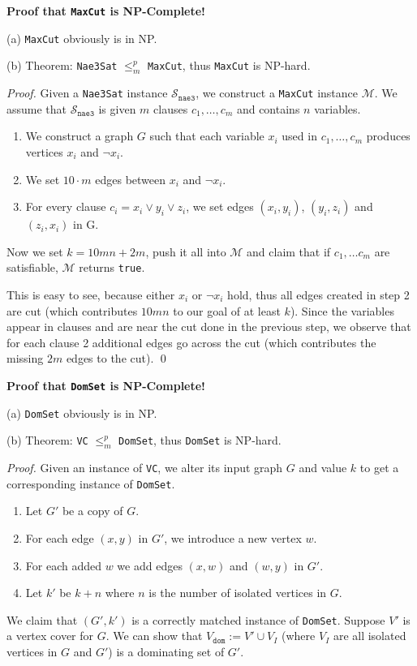 \documentclass[12pt]{article}
\newcommand{\polyreduce}{$\leq_{m}^{p}$}
\begin{document}
  \textbf{Proof that \texttt{MaxCut} is NP-Complete!}

(a) \texttt{MaxCut} obviously is in NP.

(b) Theorem: \texttt{Nae3Sat} \polyreduce{} \texttt{MaxCut}, thus \texttt{MaxCut} is NP-hard.

\vspace{.3cm}
\noindent \textit{Proof.} Given a \texttt{Nae3Sat} instance $\mathcal{S}_{\texttt{nae3}}$, we construct a \texttt{MaxCut} instance $\mathcal{M}$. We assume that $\mathcal{S}_{\texttt{nae3}}$ is given $m$ clauses $c_1,\ldots, c_m$ and contains $n$ variables.
\begin{enumerate}
 \item We construct a graph $G$ such that each variable $x_i$ used in $c_1,\ldots, c_m$ produces vertices $x_i$ and $\lnot x_i$.
 \item We set $10\cdot m$ edges between $x_i$ and $\lnot x_i$.
 \item For every clause $c_i=x_i\lor y_i\lor z_i$, we set edges $(x_i, y_i)$, $(y_i, z_i)$ and $(z_i, x_i)$ in G.
\end{enumerate}
Now we set $k=10mn+2m$, push it all into $\mathcal{M}$ and claim that if $c_1,\ldots c_m$ are satisfiable, $\mathcal{M}$ returns \texttt{true}.

This is easy to see, because either $x_i$ or $\lnot x_i$ hold, thus all edges created in step 2 are cut (which contributes $10mn$ to our goal of at least $k$). Since the variables appear in clauses and are near the cut done in the previous step, we observe that for each clause 2 additional edges go across the cut (which contributes the missing $2m$ edges to the cut). \qed


  \textbf{Proof that \texttt{DomSet} is NP-Complete!}

(a) \texttt{DomSet} obviously is in NP.

(b) Theorem: \texttt{VC} \polyreduce{} \texttt{DomSet}, thus \texttt{DomSet} is NP-hard.

\vspace{.3cm}
\noindent \textit{Proof.} Given an instance of \texttt{VC}, we alter its input graph $G$ and value $k$ to get a corresponding instance of \texttt{DomSet}. \begin{enumerate}
 \item Let $G'$ be a copy of $G$.
 \item For each edge $(x,y)$ in $G'$, we introduce a new vertex $w$.
 \item For each added $w$ we add edges $(x, w)$ and $(w, y)$ in $G'$.
 \item Let $k'$ be $k+n$ where $n$ is the number of isolated vertices in $G$.
\end{enumerate}
We claim that $(G', k')$ is a correctly matched instance of \texttt{DomSet}. Suppose $V'$ is a vertex cover for $G$. We can show that $V_{\texttt{dom}}:=V'\cup V_I$ (where $V_I$ are all isolated vertices in $G$ and $G'$) is a dominating set of $G'$.
\end{document}
